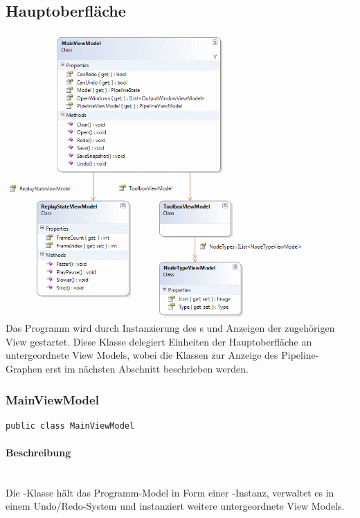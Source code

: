 \subsection{Hauptoberfläche}

\includegraphics[width=\textwidth]{YuvKA.ViewModel/main.png}
Das Programm wird durch Instanzierung des s und Anzeigen der zugehörigen View gestartet. Diese Klasse delegiert Einheiten der Hauptoberfläche an untergeordnete View Models, wobei die Klassen zur Anzeige des Pipeline-Graphen erst im nächsten Abschnitt beschrieben werden.

\subsubsection{MainViewModel}

\begin{verbatim}
public class MainViewModel
\end{verbatim}

\paragraph{Beschreibung}~\\
Die -Klasse hält das Programm-Model in Form einer -Instanz, verwaltet es in einem Undo/Redo-System und instanziert weitere untergeordnete View Models.

